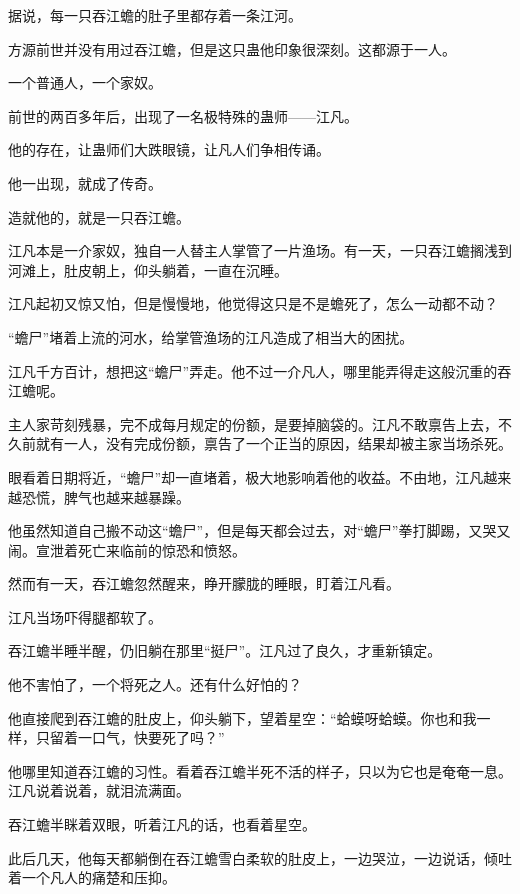 
\begin{this_body}



据说，每一只吞江蟾的肚子里都存着一条江河。

方源前世并没有用过吞江蟾，但是这只蛊他印象很深刻。这都源于一人。

一个普通人，一个家奴。

前世的两百多年后，出现了一名极特殊的蛊师——江凡。

他的存在，让蛊师们大跌眼镜，让凡人们争相传诵。

他一出现，就成了传奇。

造就他的，就是一只吞江蟾。

江凡本是一介家奴，独自一人替主人掌管了一片渔场。有一天，一只吞江蟾搁浅到河滩上，肚皮朝上，仰头躺着，一直在沉睡。

江凡起初又惊又怕，但是慢慢地，他觉得这只是不是蟾死了，怎么一动都不动？

“蟾尸”堵着上流的河水，给掌管渔场的江凡造成了相当大的困扰。

江凡千方百计，想把这“蟾尸”弄走。他不过一介凡人，哪里能弄得走这般沉重的吞江蟾呢。

主人家苛刻残暴，完不成每月规定的份额，是要掉脑袋的。江凡不敢禀告上去，不久前就有一人，没有完成份额，禀告了一个正当的原因，结果却被主家当场杀死。

眼看着日期将近，“蟾尸”却一直堵着，极大地影响着他的收益。不由地，江凡越来越恐慌，脾气也越来越暴躁。

他虽然知道自己搬不动这“蟾尸”，但是每天都会过去，对“蟾尸”拳打脚踢，又哭又闹。宣泄着死亡来临前的惊恐和愤怒。

然而有一天，吞江蟾忽然醒来，睁开朦胧的睡眼，盯着江凡看。

江凡当场吓得腿都软了。

吞江蟾半睡半醒，仍旧躺在那里“挺尸”。江凡过了良久，才重新镇定。

他不害怕了，一个将死之人。还有什么好怕的？

他直接爬到吞江蟾的肚皮上，仰头躺下，望着星空：“蛤蟆呀蛤蟆。你也和我一样，只留着一口气，快要死了吗？”

他哪里知道吞江蟾的习性。看着吞江蟾半死不活的样子，只以为它也是奄奄一息。江凡说着说着，就泪流满面。

吞江蟾半眯着双眼，听着江凡的话，也看着星空。

此后几天，他每天都躺倒在吞江蟾雪白柔软的肚皮上，一边哭泣，一边说话，倾吐着一个凡人的痛楚和压抑。


\end{this_body}

